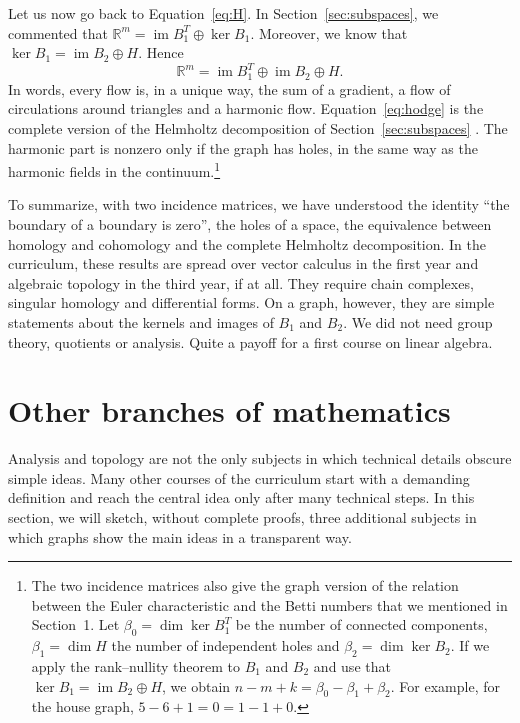 \documentclass[11pt,a4paper]{article}
\theoremstyle{plain}
\theoremstyle{definition}
\newcommand{\R}{\mathbb{R}}
\begin{document}
Let us now go back to Equation~\eqref{eq:H}. In Section~\ref{sec:subspaces}, we commented that $\R^m=\operatorname{im}B_1^T\oplus\ker B_1$. Moreover, we know that $\ker B_1=\operatorname{im}B_2\oplus H$. Hence
\begin{equation}\label{eq:hodge}
\R^m=\operatorname{im}B_1^T\oplus\operatorname{im}B_2\oplus H .
\end{equation}
In words, every flow is, in a unique way, the sum of a gradient, a flow of circulations around triangles and a harmonic flow. Equation~\eqref{eq:hodge} is the complete version of the Helmholtz decomposition of Section~\ref{sec:subspaces} \cite{eckmann1944,lim2020}. The harmonic part is nonzero only if the graph has holes, in the same way as the harmonic fields in the continuum.\footnote{The two incidence matrices also give the graph version of the relation between the Euler characteristic and the Betti numbers that we mentioned in Section~1. Let $\beta_0=\dim\ker B_1^T$ be the number of connected components, $\beta_1=\dim H$ the number of independent holes and $\beta_2=\dim\ker B_2$. If we apply the rank--nullity theorem to $B_1$ and $B_2$ and use that $\ker B_1=\operatorname{im}B_2\oplus H$, we obtain $n-m+k=\beta_0-\beta_1+\beta_2$. For example, for the house graph, $5-6+1=0=1-1+0$.}

To summarize, with two incidence matrices, we have understood the identity ``the boundary of a boundary is zero'', the holes of a space, the equivalence between homology and cohomology and the complete Helmholtz decomposition. In the curriculum, these results are spread over vector calculus in the first year and algebraic topology in the third year, if at all. They require chain complexes, singular homology and differential forms. On a graph, however, they are simple statements about the kernels and images of $B_1$ and $B_2$. We did not need group theory, quotients or analysis. Quite a payoff for a first course on linear algebra.

\section{Other branches of mathematics}\label{sec:other}

Analysis and topology are not the only subjects in which technical details obscure simple ideas. Many other courses of the curriculum start with a demanding definition and reach the central idea only after many technical steps. In this section, we will sketch, without complete proofs, three additional subjects in which graphs show the main ideas in a transparent way.
\end{document}
